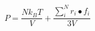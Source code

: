 \documentclass[12pt]{article}
\begin{document}
$$
   P = \frac{N k_B T}{V} + \frac{\sum_{i}^{N} r_i \bullet f_i}{3V}
$$
\end{document}
